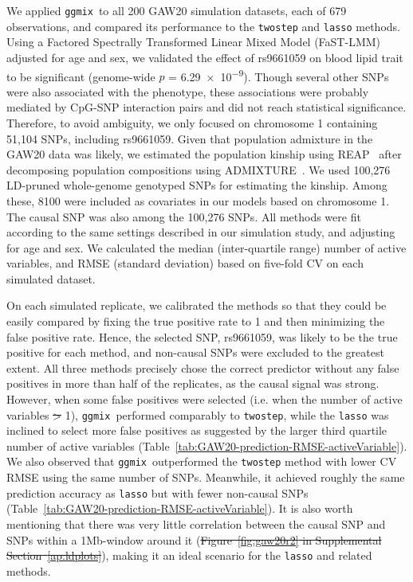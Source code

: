 \documentclass[10pt,letterpaper]{article}
\newcommand{\ggmix}{\texttt{ggmix}}
\providecommand{\DIFaddtex}[1]{{\protect\color{blue}\uwave{#1}}} %
\providecommand{\DIFdeltex}[1]{{\protect\color{red}\sout{#1}}}                      %
\providecommand{\DIFaddbegin}{} %
\providecommand{\DIFaddend}{} %
\providecommand{\DIFdelbegin}{} %
\providecommand{\DIFdelend}{} %
\providecommand{\DIFadd}[1]{\texorpdfstring{\DIFaddtex{#1}}{#1}} %
\providecommand{\DIFdel}[1]{\texorpdfstring{\DIFdeltex{#1}}{}} %
\newcommand{\DIFscaledelfig}{0.5}
\newlength{\DIFdelgraphicswidth} %
\newlength{\DIFdelgraphicsheight} %
\newcommand{\DIFaddincludegraphics}[2][]{{\color{blue}\fbox{\DIFOincludegraphics[#1]{#2}}}} %
\newcommand{\DIFdelincludegraphics}[2][]{%
\sbox{\DIFdelgraphicsbox}{\DIFOincludegraphics[#1]{#2}}%
\settoboxwidth{\DIFdelgraphicswidth}{\DIFdelgraphicsbox} %
\settoboxtotalheight{\DIFdelgraphicsheight}{\DIFdelgraphicsbox} %
\scalebox{\DIFscaledelfig}{%
\parbox[b]{\DIFdelgraphicswidth}{\usebox{\DIFdelgraphicsbox}\\[-\baselineskip] \rule{\DIFdelgraphicswidth}{0em}}\llap{\resizebox{\DIFdelgraphicswidth}{\DIFdelgraphicsheight}{%
\setlength{\unitlength}{\DIFdelgraphicswidth}%
\begin{picture}(1,1)%
\thicklines\linethickness{2pt} %
{\color[rgb]{1,0,0}\put(0,0){\framebox(1,1){}}}%
{\color[rgb]{1,0,0}\put(0,0){\line( 1,1){1}}}%
{\color[rgb]{1,0,0}\put(0,1){\line(1,-1){1}}}%
\end{picture}%
}\hspace*{3pt}}} %
} %
\DeclareRobustCommand{\DIFaddbegin}{\DIFOaddbegin \let\includegraphics\DIFaddincludegraphics} %
\DeclareRobustCommand{\DIFaddend}{\DIFOaddend \let\includegraphics\DIFOincludegraphics} %
\DeclareRobustCommand{\DIFdelbegin}{\DIFOdelbegin \let\includegraphics\DIFdelincludegraphics} %
\DeclareRobustCommand{\DIFdelend}{\DIFOaddend \let\includegraphics\DIFOincludegraphics} %
\begin{document}
We applied \ggmix ~to all 200 GAW20 simulation datasets, each of 679 observations, and compared its performance to the \texttt{twostep} and \texttt{lasso} methods.
Using a Factored Spectrally Transformed Linear Mixed Model (FaST-LMM)~\cite{howey2018application} adjusted for age and sex, we validated the effect of rs9661059 on blood lipid trait to be significant (genome-wide $p$ = \num{6.29e-9}).
Though several other SNPs were also associated with the phenotype, these associations were probably mediated by CpG-SNP interaction pairs and did not reach statistical significance.
Therefore, to avoid ambiguity, we only focused on chromosome 1 containing 51,104 SNPs, including rs9661059.
Given that population admixture in the GAW20 data was likely, we estimated the population kinship using REAP~\cite{thornton2012estimating} after decomposing population compositions using ADMIXTURE~\cite{alexander2009fast}. We used 100,276 LD-pruned whole-genome genotyped SNPs for estimating the kinship. Among these, 8100 were included as covariates in our models based on chromosome 1. The causal SNP was also among the 100,276 SNPs. All methods were fit according to the same settings described in our simulation study, and adjusting for age and sex. We calculated the median (inter-quartile range) number of active variables, and RMSE (standard deviation) based on five-fold CV on each simulated dataset.

On each simulated replicate, we calibrated the methods so that they could be easily compared by fixing the true positive rate to 1 and then minimizing the false positive rate. Hence, the selected SNP, rs9661059, was likely to be the true positive for each method, and non-causal SNPs were excluded to the greatest extent.
All three methods precisely chose the correct predictor without any false positives in more than half of the replicates, as the causal signal was strong. However, when some false positives were selected (i.e. when the number of active variables \DIFdelbegin \DIFdel{> }\DIFdelend \DIFaddbegin \DIFadd{$>$ }\DIFaddend 1), \ggmix ~performed comparably to \texttt{twostep}, while the \texttt{lasso} was inclined to select more false positives as suggested by the larger third quartile number of active variables (Table~\ref{tab:GAW20-prediction-RMSE-activeVariable}).
We also observed that \ggmix ~outperformed the \texttt{twostep} method with lower CV RMSE using the same number of SNPs. Meanwhile, it achieved roughly the same prediction accuracy as \texttt{lasso} but with fewer non-causal SNPs (Table~\ref{tab:GAW20-prediction-RMSE-activeVariable}). It is also worth mentioning that there was very little correlation between the causal SNP and SNPs within a 1Mb-window around it (\DIFdelbegin \DIFdel{Figure~\ref{fig:gaw20r2} in Supplemental Section~\ref{ap:ldplots}}\DIFdelend \DIFaddbegin \DIFadd{see~}\DIFaddend ), making it an ideal scenario for the \texttt{lasso} and related methods.
\end{document}

